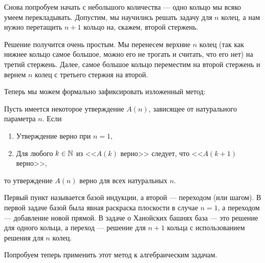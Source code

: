 Снова попробуем начать с небольшого количества --- одно кольцо мы
всяко умеем перекладывать. Допустим, мы научились решать задачу для
$n$ колец, а нам нужно перетащить $n+1$ кольцо на, скажем, второй
стержень.

Решение получится очень простым. Мы перенесем верхние $n$ колец (так
как нижнее кольцо самое большое, можно его не трогать и считать, что
его нет) на третий стержень. Далее, самое большое кольцо переместим
на второй стержень и вернем $n$ колец с третьего стержня на второй.

Теперь мы можем формально зафиксировать изложенный метод:

\begin{statement} Пусть имеется 
    некоторое утверждение $A(n)$, зависящее от натурального параметра 
    $n$. Если
    \begin{enumerate}
        \item Утверждение верно при $n=1$,
        \item Для любого $k \in \mathbb{N}$ из <<$A(k)$ верно>> следует, что
            <<$A(k+1)$ верно>>,
    \end{enumerate}
    то утверждение $A(n)$ верно для всех натуральных $n$.
\end{statement}

Первый пункт называется базой индукции, а второй --- переходом (или
шагом). В первой задаче базой была явная раскраска плоскости в случае
$n=1$, а переходом --- добавление новой прямой. В задаче о Ханойских
башнях база --- это решение для одного кольца, а переход --- решение
для $n+1$ кольца с использованием решения для $n$ колец.

Попробуем теперь применить этот метод к алгебраическим задачам.

